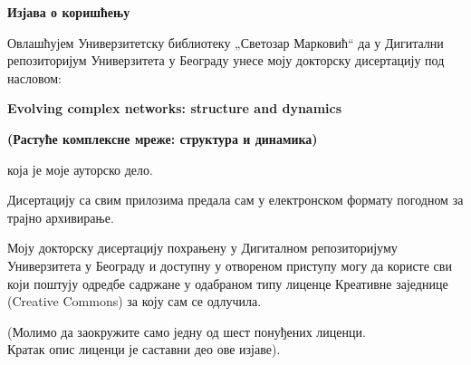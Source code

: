 
\cleardoublepage
\thispagestyle{empty}

\renewcommand{\headrulewidth}{0pt}
\setlength{\parindent}{0pt}

\normalsize

\mbox{}
\vspace{1cm}

\begin{center}
\begin{Large}\textbf{Изјава о коришћењу}
\end{Large}\end{center}

\vspace{1cm}

Овлашћујем Универзитетску библиотеку „Светозар Марковић“ да у Дигитални 
репозиторијум Универзитета у Београду унесе моју докторску дисертацију под 
насловом:

{
\textbf{Evolving complex networks: structure and dynamics}}

\textbf{(Растуће комплексне мреже: структура и динамика)}

која је моје ауторско дело. 

Дисертацију са свим прилозима предала сам у електронском формату погодном за 
трајно архивирање. 

Моју докторску дисертацију похрањену у Дигиталном репозиторијуму Универзитета у 
Београду и доступну у отвореном приступу могу да користе сви који поштују 
одредбе садржане у одабраном типу лиценце Креативне заједнице {(Creative Commons)} 
за коју сам се одлучила.
(Молимо да заокружите само једну од шест понуђених лиценци. \\
Кратак опис лиценци је саставни део ове изјаве).



